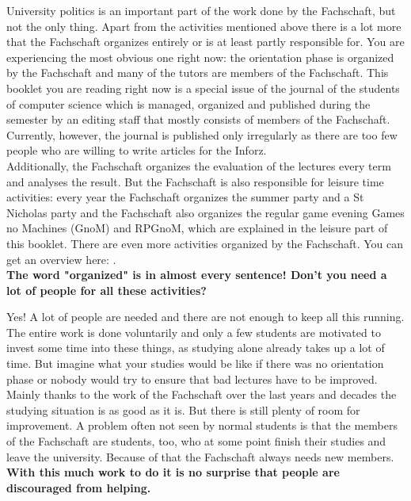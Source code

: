 {    University politics is an important part of the work done by the Fachschaft, but not the only thing. Apart from the activities mentioned above there is a lot more that the Fachschaft organizes entirely or is at least partly responsible for. You are experiencing the most obvious one right now: the orientation phase is organized by the Fachschaft and many of the tutors are members of the Fachschaft. This booklet you are reading right now is a special issue of the journal of the students of computer science which is managed, organized and published during the semester by an editing staff that mostly consists of members of the Fachschaft. Currently, however, the journal is published only irregularly as there are too few people who are willing to write articles for the Inforz.\\
    Additionally, the Fachschaft organizes the evaluation of the lectures every term and analyses the result. But the Fachschaft is also responsible for leisure time activities: every year the Fachschaft organizes the summer party and a St Nicholas party and the Fachschaft also organizes the regular game evening Games no Machines (GnoM) and RPGnoM, which are explained in the leisure part of this booklet. There are even more activities organized by the Fachschaft. You can get an overview here: \footnotemark[2].\\

    \textbf{The word "organized" is in almost every sentence! Don't you need a lot of people for all these activities?}

    Yes! A lot of people are needed and there are not enough to keep all this running. The entire work is done voluntarily and only a few students are motivated to invest some time into these things, as studying alone already takes up a lot of time. But imagine what your studies would be like if there was no orientation phase or nobody would try to ensure that bad lectures have to be improved. Mainly thanks to the work of the Fachschaft over the last years and decades the studying situation is as good as it is. But there is still plenty of room for improvement. A problem often not seen by normal students is that the members of the Fachschaft are students, too, who at some point finish their studies and leave the university. Because of that the Fachschaft always needs new members.\\

    \textbf{With this much work to do it is no surprise that people are discouraged from helping.}

}
